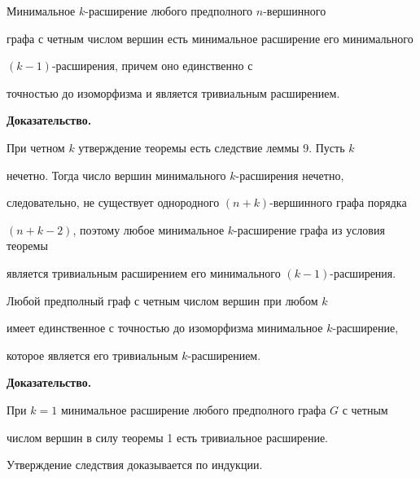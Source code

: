 \begin{lem}


Минимальное $k$-расширение любого предполного $n$-вершинного


графа с четным числом вершин есть минимальное расширение его минимального


$(k-1)$-расширения, причем оно единственно с


точностью до изоморфизма и является тривиальным расширением.


\end{lem}





{\bf Доказательство.}


При четном $k$ утверждение теоремы есть следствие леммы 9. Пусть $k$ 


нечетно. Тогда число вершин минимального $k$-расширения нечетно,


следовательно, не существует однородного $(n+k)$-вершинного графа порядка


$(n+k-2)$, поэтому любое минимальное $k$-расширение графа из условия теоремы


является тривиальным расширением его минимального $(k-1)$-расширения.





\begin{cornonum}


Любой предполный граф с четным числом вершин при любом $k$


имеет единственное с точностью до изоморфизма минимальное $k$-расширение,


которое является его тривиальным $k$-расширением.


\end{cornonum}





{\bf Доказательство.}


При $k=1$ минимальное расширение любого предполного графа $G$ с четным


числом вершин в силу теоремы 1 есть тривиальное расширение.


Утверждение следствия доказывается по индукции.





